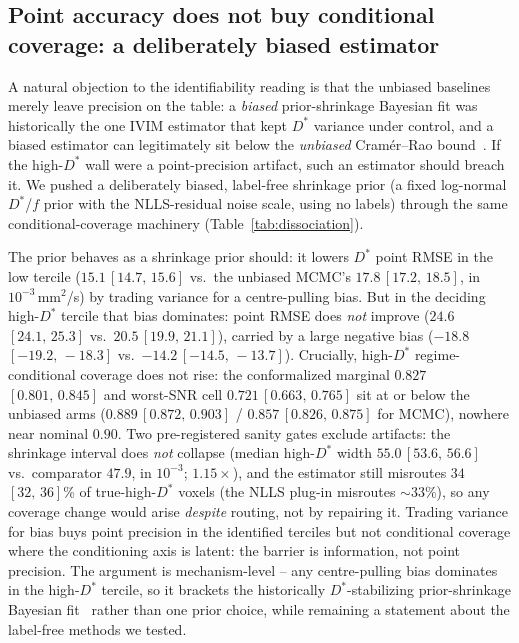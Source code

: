 \documentclass[11pt]{article}
\newcommand{\Dstar}{D^{*}}
\newcommand{\band}[2]{{\scriptsize\,$[#1,\,#2]$}}
\begin{document}
\subsection{Point accuracy does not buy conditional coverage: a deliberately
biased estimator}
\label{sec:dissociation-shrinkage}
A natural objection to the identifiability reading is that the unbiased baselines
merely leave precision on the table: a \emph{biased} prior-shrinkage Bayesian fit was
historically the one IVIM estimator that kept $\Dstar$ variance under control, and a
biased estimator can legitimately sit below the \emph{unbiased} Cram\'er--Rao
bound~\citep{gurneychampion2018}. If the high-$\Dstar$ wall were a point-precision
artifact, such an estimator should breach it. We pushed a deliberately biased,
label-free shrinkage prior (a fixed log-normal $\Dstar$/$f$ prior with the
NLLS-residual noise scale, using no labels) through the same conditional-coverage
machinery (Table~\ref{tab:dissociation}).

The prior behaves as a shrinkage prior should: it lowers $\Dstar$ point RMSE in the
low tercile ($15.1$\band{14.7}{15.6} vs.\ the unbiased MCMC's
$17.8$\band{17.2}{18.5}, in $10^{-3}$\,mm$^2$/s) by trading variance for a
centre-pulling bias. But in the deciding high-$\Dstar$ tercile that bias dominates:
point RMSE does \emph{not} improve ($24.6$\band{24.1}{25.3} vs.\
$20.5$\band{19.9}{21.1}), carried by a large negative bias
($-18.8$\band{-19.2}{-18.3} vs.\ $-14.2$\band{-14.5}{-13.7}). Crucially, high-$\Dstar$
regime-conditional coverage does not rise: the conformalized marginal
$0.827$\band{0.801}{0.845} and worst-SNR cell $0.721$\band{0.663}{0.765} sit at or
below the unbiased arms ($0.889$\band{0.872}{0.903} / $0.857$\band{0.826}{0.875} for
MCMC), nowhere near nominal $0.90$. Two pre-registered sanity gates exclude artifacts:
the shrinkage interval does \emph{not} collapse (median high-$\Dstar$ width
$55.0$\band{53.6}{56.6} vs.\ comparator $47.9$, in $10^{-3}$; $1.15\times$), and the
estimator still misroutes $34$\band{32}{36}\% of true-high-$\Dstar$ voxels (the NLLS
plug-in misroutes $\sim33\%$), so any coverage change would arise \emph{despite}
routing, not by repairing it. Trading variance for bias buys point precision in the
identified terciles but not conditional coverage where the conditioning axis is
latent: the barrier is information, not point precision. The argument is
mechanism-level -- any centre-pulling bias dominates in the high-$\Dstar$ tercile, so
it brackets the historically $\Dstar$-stabilizing prior-shrinkage Bayesian
fit~\citep{gurneychampion2018} rather than one prior choice, while remaining a
statement about the label-free methods we tested.
\end{document}
